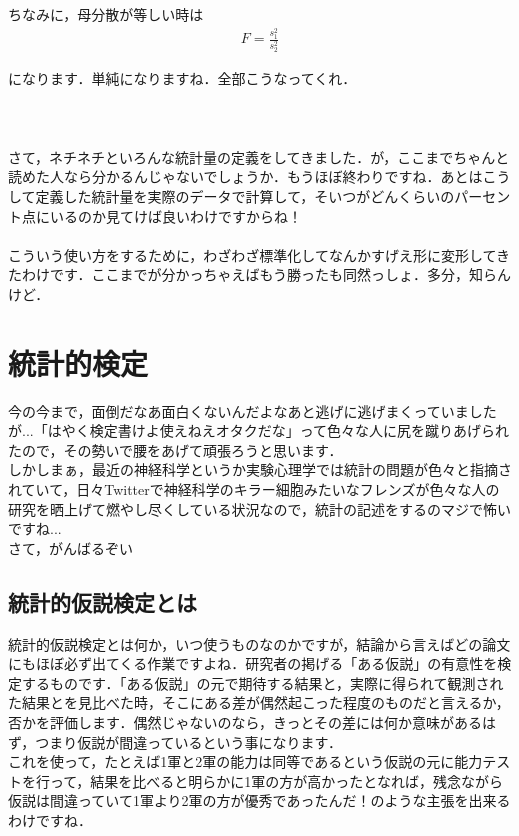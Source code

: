 \documentclass[11pt,a4paper,uplatex]{ujreport} 	%
\begin{document}
ちなみに，母分散が等しい時は
\begin{align}
  F= \frac{s_1^2}{s_2^2}
\end{align}

になります．単純になりますね．全部こうなってくれ．\\
\\
\\
\\

さて，ネチネチといろんな統計量の定義をしてきました．が，ここまでちゃんと読めた人なら分かるんじゃないでしょうか．もうほぼ終わりですね．あとはこうして定義した統計量を実際のデータで計算して，そいつがどんくらいのパーセント点にいるのか見てけば良いわけですからね！\\
\\

こういう使い方をするために，わざわざ標準化してなんかすげえ形に変形してきたわけです．ここまでが分かっちゃえばもう勝ったも同然っしょ．多分，知らんけど．

\chapter{統計的検定}
今の今まで，面倒だなあ面白くないんだよなあと逃げに逃げまくっていましたが...「はやく検定書けよ使えねえオタクだな」って色々な人に尻を蹴りあげられたので，その勢いで腰をあげて頑張ろうと思います．\\

しかしまぁ，最近の神経科学というか実験心理学では統計の問題が色々と指摘されていて，日々Twitterで神経科学のキラー細胞みたいなフレンズが色々な人の研究を晒上げて燃やし尽くしている状況なので，統計の記述をするのマジで怖いですね...\\


さて，がんばるぞい\\

\section{統計的仮説検定とは}
統計的仮説検定とは何か，いつ使うものなのかですが，結論から言えばどの論文にもほぼ必ず出てくる作業ですよね．研究者の掲げる「ある仮説」の有意性を検定するものです．「ある仮説」の元で期待する結果と，実際に得られて観測された結果とを見比べた時，そこにある差が偶然起こった程度のものだと言えるか，否かを評価します．偶然じゃないのなら，きっとその差には何か意味があるはず，つまり仮説が間違っているという事になります．\\

これを使って，たとえば1軍と2軍の能力は同等であるという仮説の元に能力テストを行って，結果を比べると明らかに1軍の方が高かったとなれば，残念ながら仮説は間違っていて1軍より2軍の方が優秀であったんだ！のような主張を出来るわけですね．\\
\end{document}
